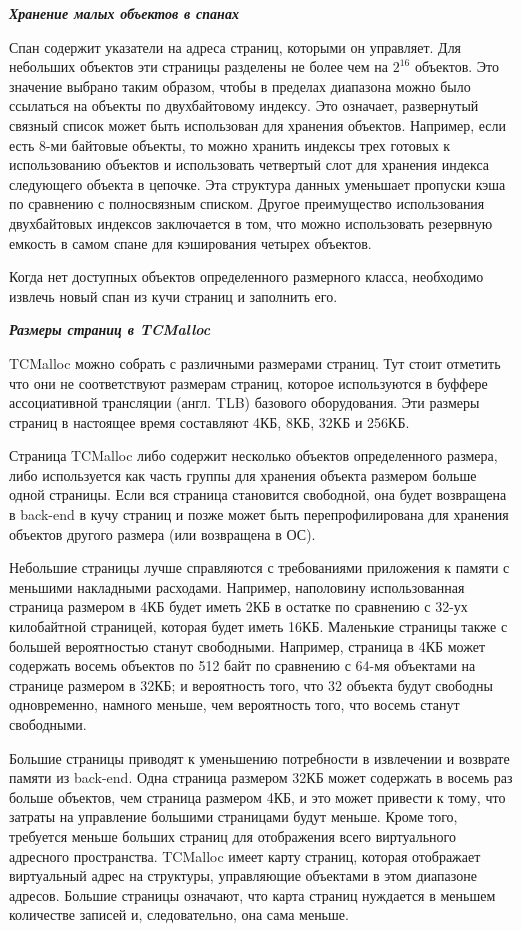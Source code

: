 \bigbreak
\textit{\textbf{Хранение малых объектов в спанах}}
	
Спан содержит указатели на адреса страниц, которыми он управляет. Для небольших объектов эти страницы разделены не более чем на $2^{16}$ объектов. Это значение выбрано таким образом, чтобы в пределах диапазона можно было ссылаться на объекты по двухбайтовому индексу. Это означает, развернутый связный список может быть использован для хранения объектов. Например, если есть 8-ми байтовые объекты, то можно хранить индексы трех готовых к использованию объектов и использовать четвертый слот для хранения индекса следующего объекта в цепочке. Эта структура данных уменьшает пропуски кэша по сравнению с полносвязным списком. Другое преимущество использования двухбайтовых индексов заключается в том, что можно использовать резервную емкость в самом спане для кэширования четырех объектов.

Когда нет доступных объектов определенного размерного класса, необходимо извлечь новый спан из кучи страниц и заполнить его.

\bigbreak
\textit{\textbf{Размеры страниц в TCMalloc}}

TCMalloc можно собрать с различными размерами страниц. Тут стоит отметить что они не соответствуют размерам страниц, которое используются в буффере ассоциативной трансляции (англ. TLB) базового оборудования. Эти размеры страниц в настоящее время составляют 4КБ, 8КБ, 32КБ и 256КБ.

Страница TCMalloc либо содержит несколько объектов определенного размера, либо используется как часть группы для хранения объекта размером больше одной страницы. Если вся страница становится свободной, она будет возвращена в back-end в кучу страниц и позже может быть перепрофилирована для хранения объектов другого размера (или возвращена в ОС).

Небольшие страницы лучше справляются с требованиями приложения к памяти с меньшими накладными расходами. Например, наполовину использованная страница размером в 4КБ будет иметь 2КБ в остатке по сравнению с 32-ух килобайтной страницей, которая будет иметь 16КБ. Маленькие страницы также с большей вероятностью станут свободными. Например, страница в 4КБ может содержать восемь объектов по 512 байт по сравнению с 64-мя объектами на странице размером в 32КБ; и вероятность того, что 32 объекта будут свободны одновременно, намного меньше, чем вероятность того, что восемь станут свободными.

Большие страницы приводят к уменьшению потребности в извлечении и возврате памяти из back-end. Одна страница размером 32КБ может содержать в восемь раз больше объектов, чем страница размером 4КБ, и это может привести к тому, что затраты на управление большими страницами будут меньше. Кроме того, требуется меньше больших страниц для отображения всего виртуального адресного пространства. TCMalloc имеет карту страниц, которая отображает виртуальный адрес на структуры, управляющие объектами в этом диапазоне адресов. Большие страницы означают, что карта страниц нуждается в меньшем количестве записей и, следовательно, она сама меньше.

